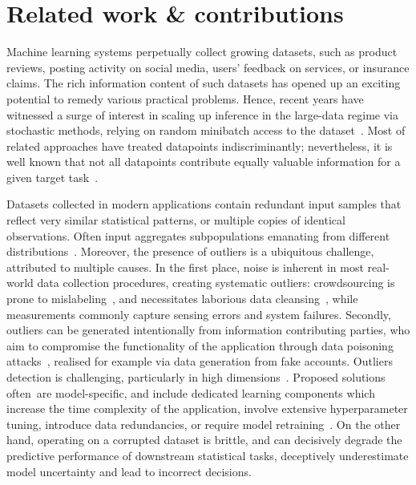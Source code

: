 \section{Related work \& contributions}
\label{sec:introduction}

Machine learning systems perpetually collect growing datasets, such as product reviews, posting activity on social media, users' feedback on services, or insurance claims. The rich information content of such datasets has opened up an exciting potential to remedy various practical problems. Hence, recent years have witnessed a surge of interest in scaling up inference in the large-data regime via stochastic methods, relying on random minibatch access to the dataset~\citep{angelino16, hoffman13, welling11}. Most of related approaches have treated datapoints indiscriminantly; nevertheless, it is well known that not all datapoints contribute equally valuable information for a given target task~\citep{ghorbani19}. 

Datasets collected in modern applications contain redundant input samples that reflect very similar statistical patterns, or multiple copies of identical observations. Often input aggregates subpopulations emanating from different distributions~\citep{zheng08, zhuang15}. Moreover, the presence of outliers is a ubiquitous challenge, attributed to multiple causes. In the first place, noise is inherent in most real-world data collection procedures, creating systematic outliers: crowdsourcing is prone to mislabeling~\citep{frenay13}, and necessitates laborious data cleansing~\citep{lewis04, paschou10}, while measurements commonly capture sensing errors and system failures. Secondly, outliers can be generated intentionally from information contributing parties, who aim to compromise the functionality of the application through data poisoning attacks~\citep{barreno10, biggio12, li16, koh17, steinhardt17, ghorbani19}, realised for example via data generation from fake accounts. Outliers detection is  challenging, particularly in high dimensions~\citep{lucic16outliers, diakonikolas19, dickens20}. Proposed solutions \mbox{often are} model-specific, and include dedicated learning components which increase the time complexity of the application, involve extensive hyperparameter tuning, introduce data redundancies, or require model retraining~\citep{sheng08, whitehill09, raykar10, karger11, liu12, zhang16}. On the other hand, operating on a corrupted dataset is brittle, and can decisively degrade the predictive performance of downstream statistical tasks, deceptively underestimate model uncertainty and lead to incorrect decisions. 

